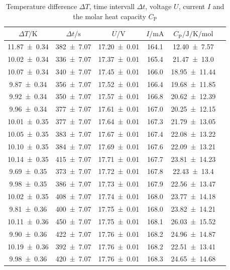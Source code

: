 \begin{table}[H]
	\centering
	\caption{Temperature difference $\Delta T$, time intervall $\Delta t$, voltage $U$, current $I$ and the molar heat capacity $C_{\text{P}}$}
	\label{tab:heat_capacity1}
	\begin{tabular}{c c c c c c}
	\toprule
	$\Delta T / \unit{\kelvin}$ & $\Delta t / \unit{\second}$ & $U / \unit{\volt} $ & $I / \unit{\milli\ampere}$ & $C_{\text{P}} / \unit{\joule\per\kelvin\per\mol}$ \\
	\midrule
	\num{11.87+-0.34}& \num{382+-7.07}& \num{17.20+-0.01} & \num{164.1} & \num{12.40+-7.57} \\
	\num{10.02+-0.34}& \num{336+-7.07}& \num{17.37+-0.01} & \num{165.4} & \num{21.47+-13.0} \\
	\num{10.07+-0.34}& \num{340+-7.07}& \num{17.45+-0.01} & \num{166.0} & \num{18.95+-11.44} \\
	\num{9.87+-0.34}& \num{356+-7.07}& \num{17.52+-0.01} & \num{166.4} & \num{19.68+-11.85} \\
	\num{9.92+-0.34}& \num{350+-7.07}& \num{17.57+-0.01} & \num{166.8} & \num{20.62+-12.39} \\
	\num{9.96+-0.34}& \num{377+-7.07}& \num{17.61+-0.01} & \num{167.0} & \num{20.25+-12.15} \\
	\num{10.01+-0.35}& \num{377+-7.07}& \num{17.64+-0.01} & \num{167.3} & \num{21.79+-13.05} \\
	\num{10.05+-0.35}& \num{383+-7.07}& \num{17.67+-0.01} & \num{167.4} & \num{22.08+-13.22} \\
	\num{10.10+-0.35}& \num{384+-7.07}& \num{17.69+-0.01} & \num{167.6} & \num{22.09+-13.21} \\
	\num{10.14+-0.35}& \num{415+-7.07}& \num{17.71+-0.01} & \num{167.7} & \num{23.81+-14.23} \\
	\num{9.69+-0.35}& \num{373+-7.07}& \num{17.72+-0.01} & \num{167.8} & \num{22.43+-13.4} \\
	\num{9.98+-0.35}& \num{386+-7.07}& \num{17.73+-0.01} & \num{167.9} & \num{22.56+-13.47} \\
	\num{10.02+-0.35}& \num{408+-7.07}& \num{17.74+-0.01} & \num{168.0} & \num{23.77+-14.18} \\
	\num{9.81+-0.36}& \num{400+-7.07}& \num{17.75+-0.01} & \num{168.0} & \num{23.82+-14.21} \\
	\num{10.11+-0.36}& \num{450+-7.07}& \num{17.75+-0.01} & \num{168.1} & \num{26.03+-15.52} \\
	\num{9.90+-0.36}& \num{422+-7.07}& \num{17.76+-0.01} & \num{168.2} & \num{24.96+-14.87} \\
	\num{10.19+-0.36}& \num{392+-7.07}& \num{17.76+-0.01} & \num{168.2} & \num{22.51+-13.41} \\
	\num{9.98+-0.36}& \num{420+-7.07}& \num{17.76+-0.01} & \num{168.3} & \num{24.65+-14.68} \\
	\bottomrule
		\end{tabular}
\end{table}

